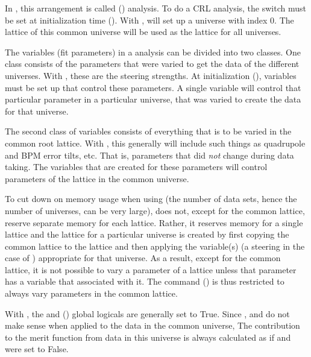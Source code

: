 {{{{{{{{In \tao, this arrangement is called  () analysis. To do a CRL
analysis, the  switch must be set at initialization time ().
With , \tao will set up a  universe with index 0.  The  lattice of
this common universe will be used as the  lattice for all universes.

The variables (fit parameters) in a  analysis can be divided into two classes. One class
consists of the parameters that were varied to get the data of the different universes. With
, these are the steering strengths. At initialization (), variables must be
set up that control these parameters. A single variable will control that particular parameter in a
particular universe, that was varied to create the data for that universe.

The second class of variables consists of everything that is to be varied in the common root
lattice. With , this generally will include such things as quadrupole and BPM error tilts,
etc. That is, parameters that did {\em not} change during data taking. The \tao variables that are
created for these parameters will control parameters of the  lattice in the common
universe.

To cut down on memory usage when using  (the number of data sets, hence the number of
universes, can be very large), \tao does not, except for the common  lattice, reserve
separate memory for each  lattice. Rather, it reserves memory for a single
 lattice and the  lattice for a particular universe is created by first
copying the common  lattice to the  lattice and then applying the variable(s)
(a steering in the case of ) appropriate for that universe.  As a result, except for the
common  lattice, it is not possible to vary a parameter of a  lattice unless
that parameter has a \tao variable that associated with it. The  command
() is thus restricted to always vary parameters in the common  lattice.

With , the  and  () global
logicals are generally set to True. Since , and  do not make
sense when applied to the data in the common universe, The contribution to the merit function from
data in this universe is always calculated as if  and  were set
to False.

}}}}}}}}

